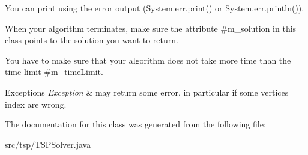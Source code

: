 You can print using the error output ({\ttfamily System.\+err.\+print()} or {\ttfamily System.\+err.\+println()}).

When your algorithm terminates, make sure the attribute \#m\+\_\+solution in this class points to the solution you want to return.

You have to make sure that your algorithm does not take more time than the time limit \#m\+\_\+time\+Limit.


\begin{DoxyExceptions}{Exceptions}
{\em Exception} & may return some error, in particular if some vertices index are wrong. \\
\hline
\end{DoxyExceptions}


The documentation for this class was generated from the following file\+:\begin{DoxyCompactItemize}
\item 
src/tsp/T\+S\+P\+Solver.\+java\end{DoxyCompactItemize}
